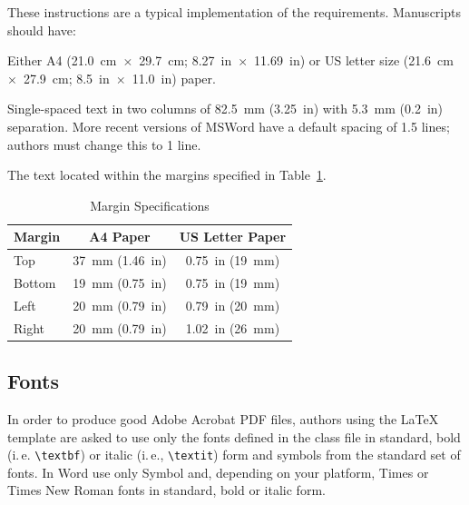 \documentclass[a4paper,
              ]{jacow}
\begin{document}
These instructions are a typical implementation of the
requirements. Manuscripts should have:
\begin{Itemize}
    \item  Either A4 (\SI{21.0}{cm}~$\times$~\SI{29.7}{cm}; \SI{8.27}{in}~$\times$~\SI{11.69}{in}) or US
           letter size (\SI{21.6}{cm}~$\times$~\SI{27.9}{cm}; \SI{8.5}{in}~$\times$~\SI{11.0}{in}) paper.
    \item  Single-spaced text in two columns of \SI{82.5}{mm} (\SI{3.25}{in}) with \SI{5.3}{mm}
           (\SI{0.2}{in}) separation. More recent versions of MSWord have a default spacing of 1.5 lines;
           authors must change this to 1 line.
    \item  The text located within the margins specified in Table~\ref{l2ea4-t1}.
\end{Itemize}
\begin{table}[hbt]
   \centering
   \caption{Margin Specifications}
   \begin{tabular}{lcc}
       \toprule
       \textbf{Margin} & \textbf{A4 Paper}                      & \textbf{US Letter Paper} \\
       \midrule
           Top         & \SI{37}{mm} (\SI{1.46}{in})            & \SI{0.75}{in} (\SI{19}{mm})        \\ %
          Bottom       & \SI{19}{mm} (\SI{0.75}{in})            & \SI{0.75}{in} (\SI{19}{mm})        \\ %
           Left        & \SI{20}{mm} (\SI{0.79}{in})            & \SI{0.79}{in} (\SI{20}{mm})        \\ %
           Right       & \SI{20}{mm} (\SI{0.79}{in})            & \SI{1.02}{in} (\SI{26}{mm})        \\
       \bottomrule
   \end{tabular}
   \label{l2ea4-t1}
\end{table}

\subsection{Fonts}

In order to produce good Adobe Acrobat PDF files, authors
using the LaTeX template are asked to use only the fonts
defined in the class file in standard, bold (i.\,e. \verb|\textbf|)
or italic (i.\,e., \verb|\textit|) form and
symbols from the standard set of fonts. In Word use only
Symbol and, depending on your platform, Times or Times New Roman
fonts in standard, bold or italic form.
\end{document}
